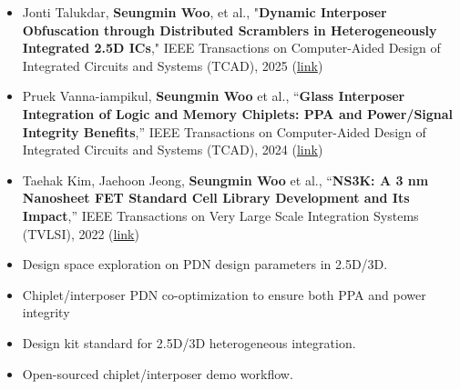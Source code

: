 \documentclass[10pt,letter,ragged2e]{altacv}
\begin{document}
\begin{itemize}
    \item Jonti Talukdar, \textbf{Seungmin Woo}, et al., "\textbf{Dynamic Interposer Obfuscation through Distributed Scramblers in Heterogeneously Integrated 2.5D ICs}," IEEE Transactions on Computer-Aided Design of Integrated Circuits and Systems (TCAD), 2025 (\href{https://doi.org/10.1109/TCAD.2025.3580649}{link})
    \item Pruek Vanna-iampikul, \textbf{Seungmin Woo} et al., “\textbf{Glass Interposer Integration of Logic and Memory Chiplets: PPA and Power/Signal Integrity Benefits},” IEEE Transactions on Computer-Aided Design of Integrated Circuits and Systems (TCAD), 2024 (\href{https://doi.org/10.1109/TCAD.2024.3504361}{link})
    \item Taehak Kim, Jaehoon Jeong, \textbf{Seungmin Woo} et al., “\textbf{NS3K: A 3 nm Nanosheet FET Standard Cell Library Development and Its Impact},” IEEE Transactions on Very Large Scale Integration Systems (TVLSI), 2022 (\href{https://doi.org/10.1109/TVLSI.2022.3229442}{link})
\end{itemize}


\vspace{100pt}


\begin{itemize}
    \item Design space exploration on PDN design parameters in 2.5D/3D. 
    \item Chiplet/interposer PDN co-optimization to ensure both PPA and power integrity
\end{itemize}

\vspace{-5pt}
\divider
\vspace{-2.5pt}

\begin{itemize}
    \item Design kit standard for 2.5D/3D heterogeneous integration.
    \item Open-sourced chiplet/interposer demo workflow. 
\end{itemize}
\end{document}
